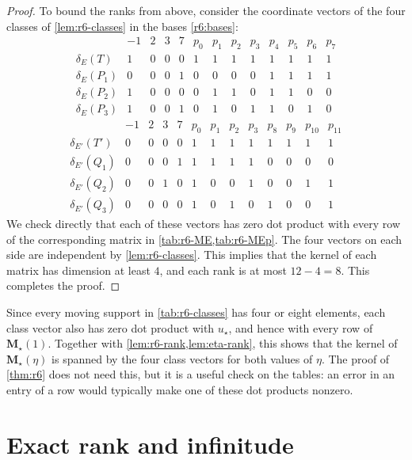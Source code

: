 \begin{proof}
To bound the ranks from above, consider the coordinate vectors of the four classes of \cref{lem:r6-classes} in the bases \eqref{r6:bases}:
\[
\begin{array}{c|cccc|cccccccc}
 & -1 & 2 & 3 & 7 & p_0 & p_1 & p_2 & p_3 & p_4 & p_5 & p_6 & p_7\\
\hline
\delta_E(T) & 1 & 0 & 0 & 0 & 1 & 1 & 1 & 1 & 1 & 1 & 1 & 1 \\
\delta_E(P_1) & 0 & 0 & 0 & 1 & 0 & 0 & 0 & 0 & 1 & 1 & 1 & 1 \\
\delta_E(P_2) & 1 & 0 & 0 & 0 & 0 & 1 & 1 & 0 & 1 & 1 & 0 & 0 \\
\delta_E(P_3) & 1 & 0 & 0 & 1 & 0 & 1 & 0 & 1 & 1 & 0 & 1 & 0
\end{array}
\]
\[
\begin{array}{c|cccc|cccccccc}
 & -1 & 2 & 3 & 7 & p_0 & p_1 & p_2 & p_3 & p_8 & p_9 & p_{10} & p_{11}\\
\hline
\delta_{E'}(T') & 0 & 0 & 0 & 0 & 1 & 1 & 1 & 1 & 1 & 1 & 1 & 1 \\
\delta_{E'}(Q_1) & 0 & 0 & 0 & 1 & 1 & 1 & 1 & 1 & 0 & 0 & 0 & 0 \\
\delta_{E'}(Q_2) & 0 & 0 & 1 & 0 & 1 & 0 & 0 & 1 & 0 & 0 & 1 & 1 \\
\delta_{E'}(Q_3) & 0 & 0 & 0 & 0 & 1 & 0 & 1 & 0 & 1 & 0 & 0 & 1
\end{array}
\]
We check directly that each of these vectors has zero dot product with every row of the corresponding matrix in \cref{tab:r6-ME,tab:r6-MEp}. The four vectors on each side are independent by \cref{lem:r6-classes}. This implies that the kernel of each matrix has dimension at least $4$, and each rank is at most $12-4=8$. This completes the proof.
\end{proof}

Since every moving support in \cref{tab:r6-classes} has four or eight elements, each class vector also has zero dot product with $u_\star$, and hence with every row of $\mathbf M_\star(1)$. Together with \cref{lem:r6-rank,lem:eta-rank}, this shows that the kernel of $\mathbf M_\star(\eta)$ is spanned by the four class vectors for both values of $\eta$. The proof of \cref{thm:r6} does not need this, but it is a useful check on the tables: an error in an entry of a row would typically make one of these dot products nonzero.

\section{Exact rank and infinitude}\label{sec:r6-theorem}

